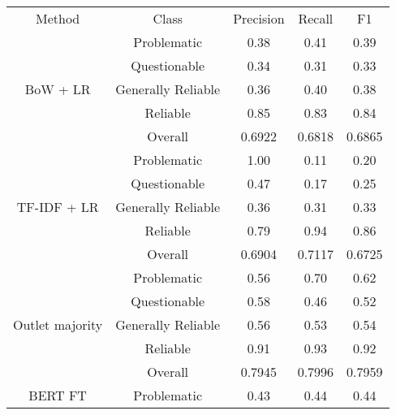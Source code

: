 \begin{table}[htbp]
    \centering
    \small
    \begin{tabular}{| c | c | c | c | c |}
        \hline                            Method & Class              & Precision & Recall & F1     \\\cline{1-5}
        \multirow{5}{*}{BoW + LR}                & Problematic        & 0.38      & 0.41   & 0.39   \\
                                                 & Questionable       & 0.34      & 0.31   & 0.33   \\
                                                 & Generally Reliable & 0.36      & 0.40   & 0.38   \\
                                                 & Reliable           & 0.85      & 0.83   & 0.84   \\
                                                 & Overall            & 0.6922    & 0.6818 & 0.6865 \\
        \hline
        \multirow{5}{*}{TF-IDF + LR}             & Problematic        & 1.00      & 0.11   & 0.20   \\
                                                 & Questionable       & 0.47      & 0.17   & 0.25   \\
                                                 & Generally Reliable & 0.36      & 0.31   & 0.33   \\
                                                 & Reliable           & 0.79      & 0.94   & 0.86   \\
                                                 & Overall            & 0.6904    & 0.7117 & 0.6725 \\
        \hline
        \multirow{5}{*}{Outlet majority}         & Problematic        & 0.56      & 0.70   & 0.62   \\
                                                 & Questionable       & 0.58      & 0.46   & 0.52   \\
                                                 & Generally Reliable & 0.56      & 0.53   & 0.54   \\
                                                 & Reliable           & 0.91      & 0.93   & 0.92   \\
                                                 & Overall            & 0.7945    & 0.7996 & 0.7959 \\
        \hline
        \multirow{5}{*}{BERT FT}                 & Problematic        & 0.43      & 0.44   & 0.44   \\

\end{tabular}
\end{table}
